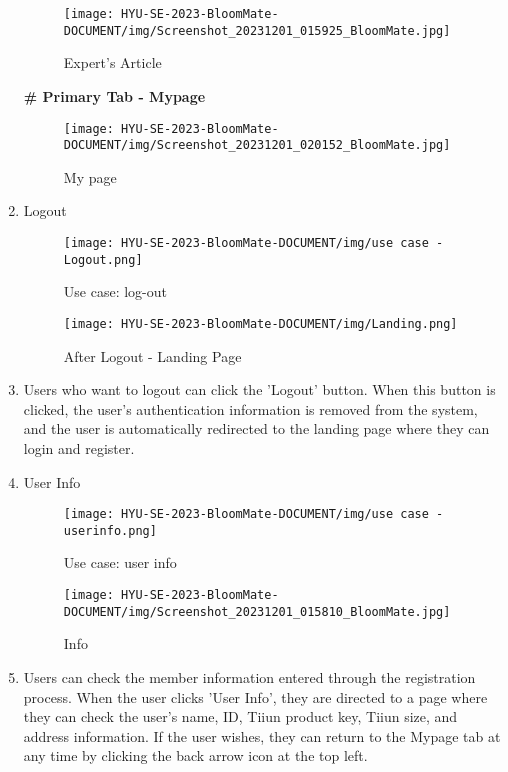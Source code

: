 \documentclass[conference, a4paper]{IEEEtran}
\begin{document}
\begin{enumerate}
\begin{figure}[h]
        \centerline{
        \texttt{[image: HYU-SE-2023-BloomMate-DOCUMENT/img/Screenshot\_20231201\_015925\_BloomMate.jpg]}
        }
        \label{fig}
        \caption{Expert's Article}
\end{figure}
\newline

\textbf{\# Primary Tab - Mypage}

        \begin{figure}[h]
        \centerline{
            \texttt{[image: HYU-SE-2023-BloomMate-DOCUMENT/img/Screenshot\_20231201\_020152\_BloomMate.jpg]}
        }
        \label{fig}
        \caption{My page}
        \end{figure}

    \item Logout
    \begin{figure}[h]
    \centerline{
        \texttt{[image: HYU-SE-2023-BloomMate-DOCUMENT/img/use case - Logout.png]}
    }
    \label{fig}
    \caption{Use case: log-out}
    \end{figure}
    
        \begin{figure}[h]
        \centerline{
            \texttt{[image: HYU-SE-2023-BloomMate-DOCUMENT/img/Landing.png]}
        }
        \label{fig}
        \caption{After Logout - Landing Page}
        \end{figure}
    \item[]Users who want to logout can click the 'Logout' button. When this button is clicked, the user's authentication information is removed from the system, and the user is automatically redirected to the landing page where they can login and register. \\

    \item User Info
    \begin{figure}[h]
    \centerline{
        \texttt{[image: HYU-SE-2023-BloomMate-DOCUMENT/img/use case - userinfo.png]}
    }
    \label{fig}
    \caption{Use case: user info}
    \end{figure}
        \begin{figure}[h]
        \centerline{
            \texttt{[image: HYU-SE-2023-BloomMate-DOCUMENT/img/Screenshot\_20231201\_015810\_BloomMate.jpg]}
        }
        \label{fig}
        \caption{Info}
        \end{figure}
    \item[]Users can check the member information entered through the registration process. When the user clicks 'User Info', they are directed to a page where they can check the user's name, ID, Tiiun product key, Tiiun size, and address information. If the user wishes, they can return to the Mypage tab at any time by clicking the back arrow icon at the top left.\\


\end{enumerate}
\end{document}
